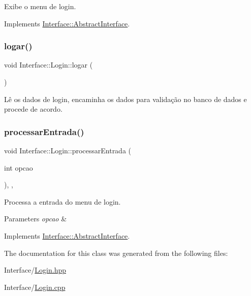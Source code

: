 Exibe o menu de login. 



Implements \hyperlink{class_interface_1_1_abstract_interface_af1a45726ea636cdbf1cf2d7daa5708be}{Interface\+::\+Abstract\+Interface}.

\mbox{\label{class_interface_1_1_login_a96f4d0d8c4903bab279fe240a09354d5}} 
\subsubsection{\texorpdfstring{logar()}{logar()}}
{\footnotesize\ttfamily void Interface\+::\+Login\+::logar (\begin{DoxyParamCaption}{ }\end{DoxyParamCaption})\hspace{0.3cm}{\ttfamily [private]}}



Lê os dados de login, encaminha os dados para validação no banco de dados e procede de acordo. 

\mbox{\label{class_interface_1_1_login_aeaba3261aa3a44806e98fcf67375e408}} 
\subsubsection{\texorpdfstring{processar\+Entrada()}{processarEntrada()}}
{\footnotesize\ttfamily void Interface\+::\+Login\+::processar\+Entrada (\begin{DoxyParamCaption}\item[{int}]{opcao }\end{DoxyParamCaption})\hspace{0.3cm}{\ttfamily [override]}, {\ttfamily [private]}, {\ttfamily [virtual]}}



Processa a entrada do menu de login. 


\begin{DoxyParams}{Parameters}
{\em opcao} & \\
\hline
\end{DoxyParams}


Implements \hyperlink{class_interface_1_1_abstract_interface_a9318f98f907ce54ef2dbf892ba327da2}{Interface\+::\+Abstract\+Interface}.



The documentation for this class was generated from the following files\+:\begin{DoxyCompactItemize}
\item 
Interface/\hyperlink{_login_8hpp}{Login.\+hpp}\item 
Interface/\hyperlink{_login_8cpp}{Login.\+cpp}\end{DoxyCompactItemize}
